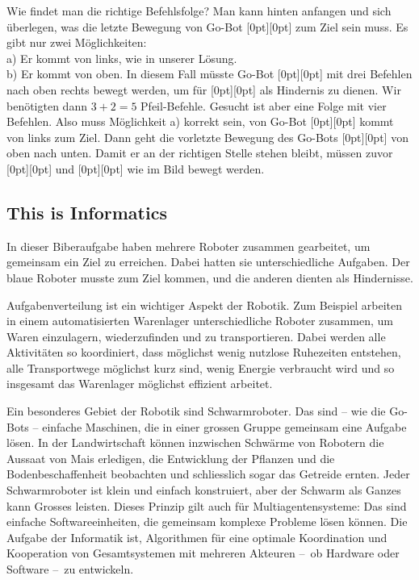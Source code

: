\documentclass[a4paper,11pt]{report}
\newcommand{\taskGraphicsFolder}{..}
\begin{document}
Wie findet man die richtige Befehlsfolge?  Man kann hinten anfangen und sich überlegen, was die letzte Bewegung von Go-Bot \raisebox{-0.5ex}[0pt][0pt]{} zum Ziel sein muss. Es gibt nur zwei Möglichkeiten: \\
a) Er kommt von links, wie in unserer Lösung. \\
b) Er kommt von oben. In diesem Fall müsste Go-Bot \raisebox{-0.5ex}[0pt][0pt]{} mit drei Befehlen nach oben rechts bewegt werden, um für \raisebox{-0.5ex}[0pt][0pt]{} als Hindernis zu dienen. Wir benötigten dann ${3 + 2 = 5}$ Pfeil-Befehle.
Gesucht ist aber eine Folge mit vier Befehlen. Also muss Möglichkeit a) korrekt sein, von Go-Bot \raisebox{-0.5ex}[0pt][0pt]{} kommt von links zum Ziel. Dann geht die vorletzte Bewegung des Go-Bots \raisebox{-0.5ex}[0pt][0pt]{} von oben nach unten. Damit er an der richtigen Stelle stehen bleibt, müssen zuvor \raisebox{-0.5ex}[0pt][0pt]{} und \raisebox{-0.5ex}[0pt][0pt]{} wie im Bild bewegt werden.


\subsection*{This is Informatics}

In dieser Biberaufgabe haben mehrere Roboter zusammen gearbeitet, um gemeinsam ein Ziel zu erreichen. Dabei hatten sie unterschiedliche Aufgaben. Der blaue Roboter musste zum Ziel kommen, und die anderen dienten als Hindernisse.

Aufgabenverteilung ist ein wichtiger Aspekt der Robotik. Zum Beispiel arbeiten in einem automatisierten Warenlager unterschiedliche Roboter zusammen, um Waren einzulagern, wiederzufinden und zu transportieren. Dabei werden alle Aktivitäten so koordiniert, dass möglichst wenig nutzlose Ruhezeiten entstehen, alle Transportwege möglichst kurz sind, wenig Energie verbraucht wird und so insgesamt das Warenlager möglichst effizient arbeitet.

Ein besonderes Gebiet der Robotik sind Schwarmroboter. Das sind – wie die Go-Bots – einfache Maschinen, die in einer grossen Gruppe gemeinsam eine Aufgabe lösen. In der Landwirtschaft können inzwischen Schwärme von Robotern die Aussaat von Mais erledigen, die Entwicklung der Pflanzen und die Bodenbeschaffenheit beobachten und schliesslich sogar das Getreide ernten. Jeder Schwarmroboter ist klein und einfach konstruiert, aber der Schwarm als Ganzes kann Grosses leisten. Dieses Prinzip gilt auch für Multiagentensysteme: Das sind einfache Softwareeinheiten, die gemeinsam komplexe Probleme lösen können. Die Aufgabe der Informatik ist, Algorithmen für eine optimale Koordination und Kooperation von Gesamtsystemen mit mehreren Akteuren –~ob Hardware oder Software –~zu entwickeln.
\end{document}
